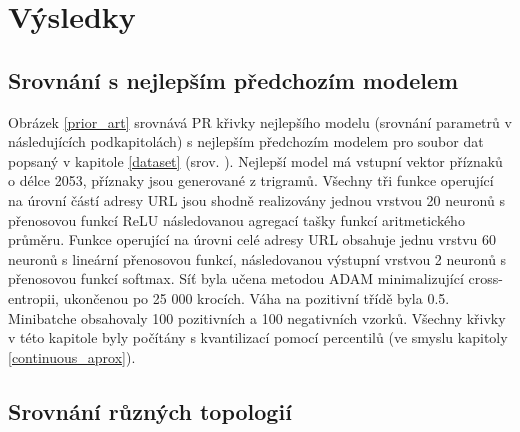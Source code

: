 \chapter{Výsledky}

\section{Srovnání s nejlepším předchozím modelem}\label{prior_art_comparison}
Obrázek \ref{prior_art} srovnává PR křivky nejlepšího modelu (srovnání parametrů v následujících podkapitolách) s nejlepším předchozím modelem pro soubor dat popsaný v kapitole \ref{dataset} (srov. \cite{machlica_learning_2017}). Nejlepší model má vstupní vektor příznaků o délce 2053, příznaky jsou generované z trigramů. Všechny tři funkce operující na úrovní částí adresy URL jsou shodně realizovány jednou vrstvou 20 neuronů s přenosovou funkcí ReLU následovanou agregací tašky funkcí aritmetického průměru. Funkce operující na úrovni celé adresy URL obsahuje jednu vrstvu 60 neuronů s lineární přenosovou funkcí, následovanou výstupní vrstvou 2 neuronů s přenosovou funkcí softmax. Síť byla učena metodou ADAM minimalizující cross-entropii, ukončenou po 25 000 krocích. Váha na pozitivní třídě byla 0.5. Minibatche obsahovaly 100 pozitivních a 100 negativních vzorků.  Všechny křivky v této kapitole byly počítány s kvantilizací pomocí percentilů (ve smyslu kapitoly \ref{continuous_aprox}).


\section{Srovnání různých topologií}

